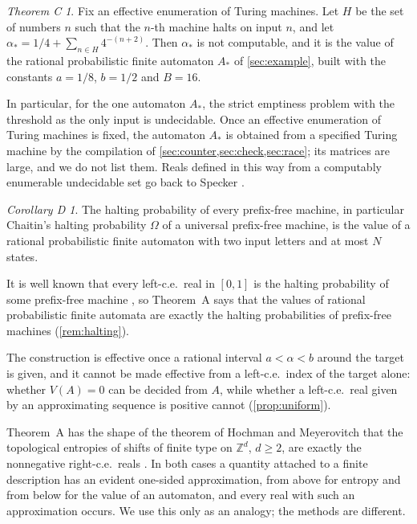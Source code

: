 \documentclass[11pt]{article}
\theoremstyle{plain}
\theoremstyle{definition}
\theoremstyle{remark}
\newtheorem*{mainC}{Theorem C}
\newtheorem*{mainD}{Corollary D}
\begin{document}
\begin{mainC}
Fix an effective enumeration of Turing machines. Let $H$ be the set of numbers $n$ such that the $n$-th machine halts on input $n$, and let $\alpha_*=1/4+\sum_{n\in H}4^{-(n+2)}$. Then $\alpha_*$ is not computable, and it is the value of the rational probabilistic finite automaton $A_*$ of \cref{sec:example}, built with the constants $a=1/8$, $b=1/2$ and $B=16$.
\end{mainC}

In particular, for the one automaton $A_*$, the strict emptiness problem with the threshold as the only input is undecidable. Once an effective enumeration of Turing machines is fixed, the automaton $A_*$ is obtained from a specified Turing machine by the compilation of \cref{sec:counter,sec:check,sec:race}; its matrices are large, and we do not list them. Reals defined in this way from a computably enumerable undecidable set go back to Specker \cite{Spe49}.

\begin{mainD}
The halting probability of every prefix-free machine, in particular Chaitin's halting probability $\Omega$ of a universal prefix-free machine, is the value of a rational probabilistic finite automaton with two input letters and at most $N$ states.
\end{mainD}

It is well known that every left-c.e.\ real in $[0,1]$ is the halting probability of some prefix-free machine \cite{CHKW01,DH10}, so Theorem~A says that the values of rational probabilistic finite automata are exactly the halting probabilities of prefix-free machines (\cref{rem:halting}).

The construction is effective once a rational interval $a<\alpha<b$ around the target is given, and it cannot be made effective from a left-c.e.\ index of the target alone: whether $V(A)=0$ can be decided from $A$, while whether a left-c.e.\ real given by an approximating sequence is positive cannot (\cref{prop:uniform}).

Theorem~A has the shape of the theorem of Hochman and Meyerovitch that the topological entropies of shifts of finite type on $\mathbb Z^d$, $d\ge2$, are exactly the nonnegative right-c.e.\ reals \cite{HM10}. In both cases a quantity attached to a finite description has an evident one-sided approximation, from above for entropy and from below for the value of an automaton, and every real with such an approximation occurs. We use this only as an analogy; the methods are different.
\end{document}
